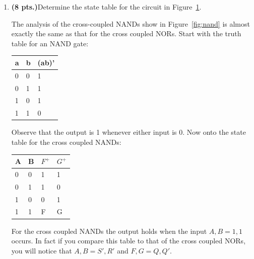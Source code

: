 \begin{enumerate}

\item {\bf (8 pts.)}Determine the state table for the circuit in Figure~\ref{fig:NANDs}.
\begin{figure}[ht]
\caption{}
\label{fig:NANDs}
\end{figure}


\begin{solution}{
The analysis of the cross-coupled NANDs show in Figure~\ref{fig:nand} is
almost exactly the same as that for the cross coupled NORs.  Start with
the truth table for an NAND gate:

\begin{tabular}{l|l||l}
a & b & (ab)' \\ \hline
0 & 0 & 1 \\ \hline
0 & 1 & 1 \\ \hline
1 & 0 & 1 \\ \hline
1 & 1 & 0 \\ 
\end{tabular}

Observe that the output is 1 whenever
either input is 0.  Now onto the state table for the cross coupled NANDs:

\begin{tabular}{l|l||l|l}
A & B & $F^+$ & $G^+$ \\ \hline
0 & 0 & 1 & 1 \\ \hline
0 & 1 & 1 & 0 \\ \hline
1 & 0 & 0 & 1 \\ \hline
1 & 1 & F & G \\ 
\end{tabular}

For the cross coupled NANDs the output holds when the input $A,B=1,1$ occurs.
In fact if you compare this table to that of the cross coupled NORs, you will
notice that $A,B = S',R'$ and $F,G = Q,Q'$.
} \end{solution}


\end{enumerate}
